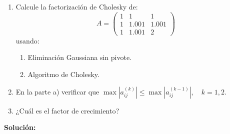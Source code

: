 \begin{enumerate}[]
    \item Calcule la factorización de Cholesky de: 
        \begin{equation}
            A = \begin{pmatrix}
                1 & 1     & 1     \\ 
                1 & 1.001 & 1.001 \\ 
                1 & 1.001 & 2
            \end{pmatrix}
        \end{equation}
        usando:
        \begin{enumerate}[]
            \item Eliminación Gaussiana sin pivote.
            \item Algoritmo de Cholesky.
        \end{enumerate}
    \item En la parte a) verificar que $\max |a^{(k)}_{ij}| \leq \max |a^{(k-1)}_{ij}|, \quad k=1,2$.
    \item ¿Cuál es el factor de crecimiento?
\end{enumerate}

\textbf{Solución:}

